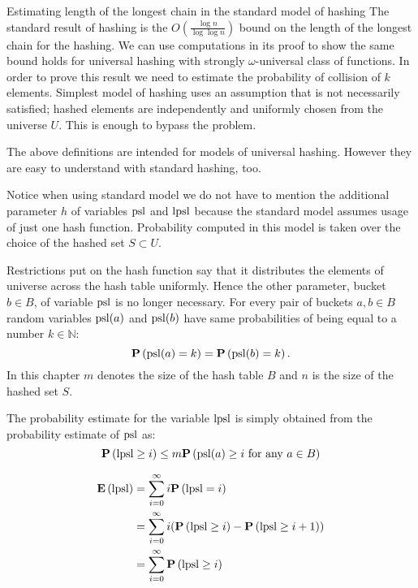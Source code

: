 \begin{section}{Estimating length of the longest chain in the standard model of hashing}
The standard result of hashing is the $O\left(\frac{\log n}{\log \log n}\right)$ bound on the length of the longest chain for the hashing. We can use computations in its proof to show the same bound holds for universal hashing with strongly $\omega$-universal class of functions. In order to prove this result we need to estimate the probability of collision of $k$ elements. Simplest model of hashing uses an assumption that is not necessarily satisfied; hashed elements are independently and uniformly chosen from the universe $U$. This is enough to bypass the problem. 

The above definitions are intended for models of universal hashing. However they are easy to understand with standard hashing, too. 

Notice when using standard model we do not have to mention the additional parameter $h$ of variables $\mathrm{psl}$ and $\mathrm{lpsl}$ because the standard model assumes usage of just one hash function. Probability computed in this model is taken over the choice of the hashed set $S \subset U$. 

Restrictions put on the hash function say that it distributes the elements of universe across the hash table uniformly. Hence the other parameter, bucket $b \in B$, of variable $\mathrm{psl}$ is no longer necessary. For every pair of buckets $a, b \in B$ random variables $\mathrm{psl}(a)$ and $\mathrm{psl}(b)$ have same probabilities of being equal to a number $k \in \mathbb{N}$: \[\mathbf{P}\left(\mathrm{psl}(a) = k\right) = \mathbf{P}\left(\mathrm{psl}(b) = k\right) \text{.}\] In this chapter $m$ denotes the size of the hash table $B$ and $n$ is the size of the hashed set $S$.

The probability estimate for the variable $\mathrm{lpsl}$ is simply obtained from the probability estimate of $\mathrm{psl}$ as:
\begin{displaymath}
\mathbf{P}\left(\mathrm{lpsl} \geq i\right) \leq m \mathbf{P}\left(\mathrm{psl}(a) \geq i \text{ for any } a \in B\right)
\end{displaymath}

\begin{displaymath}
\begin{split}
\mathbf{E}\left(\mathrm{lpsl}\right)
	& = \displaystyle \sum_{i=0}^{\infty} i \mathbf{P}\left(\mathrm{lpsl} = i\right) \\
	& = \displaystyle \sum_{i = 0}^{\infty} i (\mathbf{P}\left(\mathrm{lpsl} \geq i\right) - \mathbf{P}\left(\mathrm{lpsl} \geq i + 1\right)) \\ 
	& = \displaystyle \sum_{i = 0}^{\infty} \mathbf{P}\left(\mathrm{lpsl} \geq i\right)
\end{split}
\end{displaymath}


\end{section}
